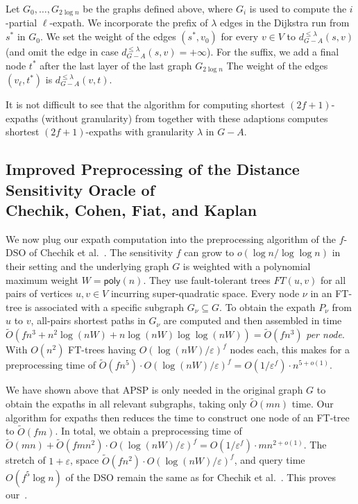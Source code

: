 \documentclass{theoretics}
\newcommand*{\Otilde}{\widetilde{O}}
\newcommand*{\poly}{\textsf{poly}}
\renewcommand{\le}{\leqslant}
\begin{document}
Let $G_0, \ldots, G_{2 \log n}$ be the graphs defined above,
where $G_i$ is used to compute the $i$-partial \mbox{$\ell$-expath}.
We incorporate the prefix of $\lambda$ edges in the Dijkstra run from $s^*$ in $G_0$.
We set the weight of the edges $(s^*, v_{0})$ for every $v \in V$ to $d_{G-A}^{\le \lambda}(s,v)$
(and omit the edge in case $d_{G-A}^{\le \lambda}(s,v) = +\infty$).
For the suffix, we add a final node $t^*$ after the last layer of the last graph $G_{2\log n}$
The weight of the edges $(v_{\ell}, t^*)$ is $d_{G-A}^{\le \lambda}(v, t)$.

It is not difficult to see that the algorithm for computing shortest $(2f{+}1)$-expaths 
(without granularity) from  together with these adaptions computes shortest \mbox{$(2f{+}1)$-expaths} with granularity $\lambda$ in $G{-}A$.


\subsection{Improved Preprocessing of the Distance Sensitivity Oracle of \texorpdfstring{\\}{} Chechik, Cohen, Fiat, and Kaplan}
\label{subsec:improved_preproc_DSO}

We now plug our expath computation into the preprocessing algorithm
of the $f$-DSO of Chechik et al.~\cite{ChCoFiKa17}.
The sensitivity $f$ can grow to $o(\log n/\log\log n)$ in their setting
and the underlying graph $G$ is weighted with a polynomial maximum weight $W = \poly(n)$.
They use fault-tolerant trees $FT(u,v)$ for all pairs of vertices $u,v \in V$
incurring super-quadratic space.
Every node $\nu$ in an FT-tree is associated with a specific subgraph $G_\nu \subseteq G$.
To obtain the expath $P_{\nu}$ from $u$ to $v$,
all-pairs shortest paths in $G_\nu$ are computed
and then assembled in time
$\Otilde(fn^3 + n^2\log (nW) + n \log (nW) \log \log (nW)) = \Otilde(fn^3)$ \emph{per node}.
With $O(n^2)$ FT-trees having $O(\log(nW)/\varepsilon)^f$ nodes each,
this makes for a preprocessing time of
$\Otilde(fn^5) \cdot O(\log(nW)/\varepsilon)^f
  = O(1/\varepsilon^f)  \cdot n^{5+o(1)}$.

We have shown above that APSP is only needed in the original graph $G$ to obtain 
the expaths in all relevant subgraphs,
taking only $\Otilde(mn)$ time.
Our algorithm for expaths then reduces the time to construct one node of an FT-tree to $\Otilde(fm)$.
In total, we obtain a preprocessing time of 
$\Otilde(mn) + \Otilde(fmn^2) \cdot O(\log(nW)/\varepsilon)^f 
	= O(1/\varepsilon^f)  \cdot mn^{2+o(1)}$.
The stretch of $1+\varepsilon$, space $\Otilde(fn^2) \cdot O(\log(nW)/\varepsilon)^f$,
and query time $O(f^5 \log n)$ of the DSO remain the same as for Chechik et al.~\cite[Theorem~3.2]{ChCoFiKa17}.
This proves our~.


 
\printbibliography
\end{document}
